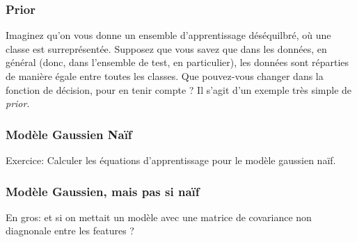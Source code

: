 \documentclass[french,twoside]{article}
\begin{document}
\subsubsection{Prior}

Imaginez qu'on vous donne un ensemble d'apprentissage déséquilbré, où une classe est surreprésentée.
Supposez que vous savez que dans les données, en général (donc, dans l'ensemble de test, en particulier), les données sont réparties de manière égale entre toutes les classes. Que pouvez-vous changer dans la fonction de décision, pour en tenir compte ?
Il s'agit d'un exemple très simple de \textit{prior}.



\subsubsection{Modèle Gaussien Naïf}

Exercice:
Calculer les équations d'apprentissage pour le modèle gaussien naïf.


\subsubsection{Modèle Gaussien, mais pas si naïf}

En gros: et si on mettait un modèle avec une matrice de covariance non diagnonale entre les features ?




%
%
%
%
%
\end{document}
